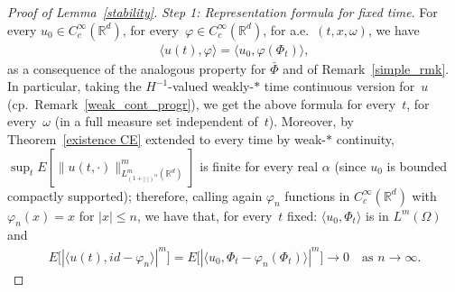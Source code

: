 \documentclass[a4paper,10pt]{article}
\newcommand\1{\mathbbm{1}}
\newcommand{\lan}{\langle}
\newcommand{\ran}{\rangle}
\numberwithin{equation}{section}
\begin{document}
\begin{proof}[Proof of Lemma~\ref{stability}]
\emph{Step 1: Representation formula for fixed time}. For every $u_0 \in C^\infty_c(\mathbb{R}^d)$, for every~$\varphi \in C^\infty_c(\mathbb{R}^d)$, for a.e.~$(t,x,\omega)$, we have
\begin{align}
\lan u(t),\varphi\ran = \lan u_0,\varphi(\Phi_t)\ran,\label{repr_formula_CE}
\end{align}
as a consequence of the analogous property for $\bar{\Phi}$ and of Remark~\ref{simple_rmk}. In particular, taking the $H^{-1}$-valued weakly-$*$ time continuous version for~$u$ (cp.~Remark~\ref{weak_cont_progr}), we get the above formula for every~$t$, for every~$\omega$ (in a full measure set independent of~$t$). Moreover, by Theorem~\ref{existence CE} extended to every time by weak-$*$ continuity, $\sup_t E[\|u(t,\cdot)\|_{L^m_{(1+|\cdot|)^\alpha}(\mathbb{R}^d)}^m]$ is finite for every real $\alpha$ (since $u_0$ is bounded compactly supported); therefore, calling again $\varphi_n$ functions in $C^\infty_c(\mathbb{R}^d)$ with $\varphi_n(x)=x$ for $|x|\le n$, we have that, for every~$t$ fixed: $\lan u_0,\Phi_t\ran$ is in $L^m(\Omega)$ and 
\begin{align*}
E\big[\left| \lan u(t),id-\varphi_n\ran \right|^m\big] = E\big[\left|\lan u_0,\Phi_t-\varphi_n(\Phi_t)\ran \right|^m\big] \rightarrow 0 \quad \text{as } n \to \infty.
\end{align*}


\end{proof}
\end{document}
